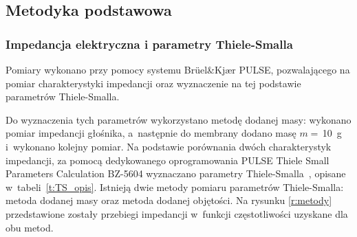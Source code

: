 \documentclass[12pt]{oska}
\begin{document}
	\subsection{Metodyka podstawowa}\label{ss:metodyka}
	
		\subsubsection{Impedancja elektryczna i parametry Thiele-Smalla}
			
			Pomiary wykonano przy pomocy systemu Brüel\&Kjær PULSE, pozwalającego na pomiar charakterystyki impedancji oraz wyznaczenie na tej podstawie parametrów Thiele-Smalla.
			
			Do wyznaczenia tych parametrów wykorzystano metodę dodanej masy: wykonano pomiar impedancji głośnika, a~następnie do membrany dodano masę $m=\,$\SI{10}{\gram} i~wykonano kolejny pomiar. Na podstawie porównania dwóch charakterystyk impedancji, za pomocą dedykowanego oprogramowania PULSE Thiele Small Parameters Calculation BZ-5604 wyznaczano parametry Thiele-Smalla~\cite{BK_pulse_TS}, opisane w~tabeli~\ref{t:TS_opis}.
			Istnieją dwie metody pomiaru parametrów Thiele-Smalla: metoda dodanej masy oraz metoda dodanej objętości. Na rysunku \ref{r:metody} przedstawione zostały przebiegi impedancji w~funkcji częstotliwości uzyskane dla obu metod. 
			
\end{document}
